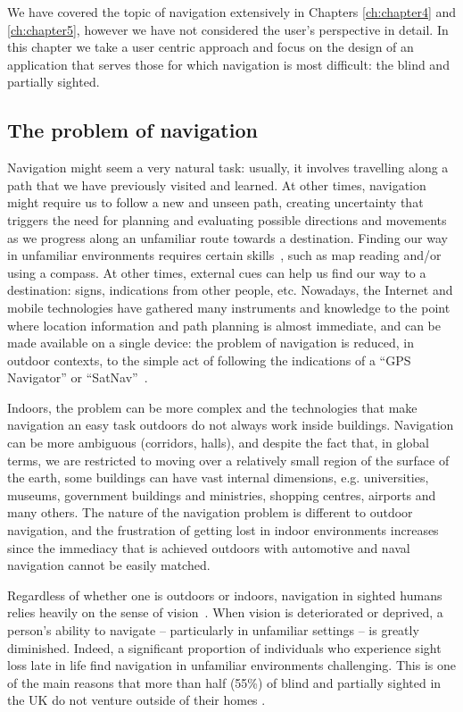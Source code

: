 We have covered the topic of navigation extensively in Chapters \ref{ch:chapter4} and \ref{ch:chapter5}, however we have not considered the user's perspective in detail. In this chapter we take a user centric approach and focus on the design of an application that serves those for which navigation is most difficult: the blind and partially sighted.

\subsection{The problem of navigation}

 Navigation might seem a very natural task: usually, it involves travelling along a path that we have previously visited and learned. At other times, navigation might require us to follow a new and unseen path, creating uncertainty that triggers the need for planning and evaluating possible directions and movements as we progress along an unfamiliar route towards a destination. Finding our way in unfamiliar environments requires certain skills~\citep{foulke1982perception}, such as map reading and/or using a compass. At other times, external cues can help us find our way to a destination: signs, indications from other people, etc. Nowadays, the Internet and mobile technologies have gathered many instruments and knowledge to the point where location information and path planning is almost immediate, and can be made available on a single device: the problem of navigation is reduced, in outdoor contexts, to the simple act of following the indications of a ``GPS Navigator'' or ``SatNav''~\citep{spirkovska2005summary}.

Indoors, the problem can be more complex and the technologies that make navigation an easy task outdoors do not always work inside buildings. Navigation can be more ambiguous (corridors, halls), and despite the fact that, in global terms, we are restricted to moving over a relatively small region of the surface of the earth, some buildings can have vast internal dimensions, e.g. universities, museums, government buildings and ministries, shopping centres, airports and many others. The nature of the navigation problem is different to outdoor navigation, and the frustration of getting lost in indoor environments increases since the immediacy that is achieved outdoors with automotive and naval navigation cannot be easily matched.
 
Regardless of whether one is outdoors or indoors, navigation in sighted humans relies heavily on the sense of vision~\citep{kalia2008learning,tsuji2005landmarks}. When vision is deteriorated or deprived, a person's ability to navigate -- particularly in unfamiliar settings -- is greatly diminished. Indeed, a significant proportion of individuals who experience sight loss late in life find navigation in unfamiliar environments challenging. This is one of the main reasons that more than half (55\%) of blind and partially sighted in the UK do not venture outside of their homes \citep{Worsfold2010}.

